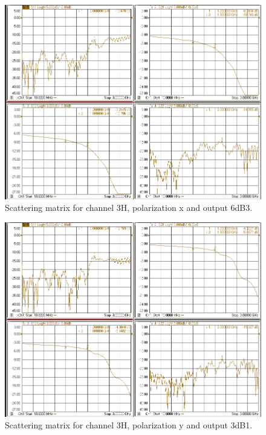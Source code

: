 \documentclass[12pt,a4paper,oneside]{article}
\begin{document}
\begin{figure}[H]
\centering
\includegraphics[width=0.9\linewidth]{VNA_results/3Hx_6dB3.png}
\caption{Scattering matrix for channel 3H, polarization x and output 6dB3.}
\label{fig:3Hx_6dB3}
\end{figure}


\begin{figure}[H]
\centering
\includegraphics[width=0.9\linewidth]{VNA_results/3Hy_3dB1.png}
\caption{Scattering matrix for channel 3H, polarization y and output 3dB1.}
\label{fig:3Hy_3dB1}
\end{figure}
\end{document}
